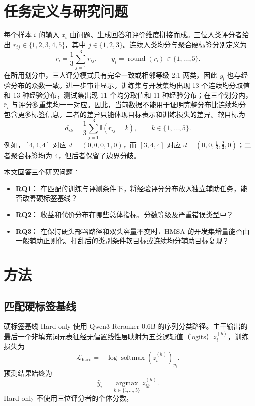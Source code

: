 \documentclass[UTF8,fontset=fandol,a4paper,11pt]{ctexart}
\begin{document}


\section{任务定义与研究问题}

每个样本 $i$ 的输入 $x_i$ 由问题、生成回答和评价维度拼接而成。三位人类评分者给出 $r_{ij}\in\{1,2,3,4,5\}$，其中 $j\in\{1,2,3\}$。连续人类均分与聚合硬标签分别定义为
\begin{equation}
\bar r_i=\frac{1}{3}\sum_{j=1}^{3}r_{ij},\qquad
y_i=\operatorname{round}(\bar r_i)\in\{1,\ldots,5\}.
\end{equation}
在所用划分中，三人评分模式只有完全一致或相邻等级 2:1 两类，因此 $y_i$ 也与经验分布的众数一致。进一步审计显示，训练集与开发集均出现 13 个连续均分取值和 13 种经验分布，测试集出现 11 个均分取值和 11 种经验分布；在三个划分内，$\bar r_i$ 与评分多重集均一一对应。因此，当前数据不能用于证明完整分布比连续均分包含更多标签信息，二者的差异只能体现目标表示和训练损失的差异。软目标为
\begin{equation}
d_{ik}=\frac{1}{3}\sum_{j=1}^{3}\mathbb{I}(r_{ij}=k),\qquad k\in\{1,\ldots,5\}.
\end{equation}
例如，$[4,4,4]$ 对应 $d=(0,0,0,1,0)$，而 $[3,4,4]$ 对应 $d=(0,0,\frac{1}{3},\frac{2}{3},0)$；二者聚合标签均为 4，但后者保留了边界分歧。

本文回答三个研究问题：

\begin{itemize}[leftmargin=2em]
  \item \textbf{RQ1：} 在匹配的训练与评测条件下，将经验评分分布放入独立辅助任务，能否改善硬标签基线？
  \item \textbf{RQ2：} 收益和代价分布在哪些总体指标、分数等级及严重错误类型中？
  \item \textbf{RQ3：} 在保持硬头部署路径和双头容量不变时，HMSA 的开发集增量能否由一般辅助正则化、打乱后的类别条件软目标或连续均分辅助目标复现？
\end{itemize}

\section{方法}

\subsection{匹配硬标签基线}

硬标签基线 Hard-only 使用 Qwen3-Reranker-0.6B 的序列分类路径\cite{qwen3embedding}。主干输出的最后一个非填充词元表征经无偏置线性层映射为五类逻辑值（logits）$z_i^{(h)}$，训练损失为
\begin{equation}
\mathcal{L}_{\mathrm{hard}}=-\log \operatorname{softmax}(z_i^{(h)})_{y_i}.
\end{equation}
预测结果始终为
\begin{equation}
\hat y_i=\operatorname*{argmax}_{k\in\{1,\ldots,5\}}z_{ik}^{(h)}.
\end{equation}
Hard-only 不使用三位评分者的个体分数。
\end{document}
